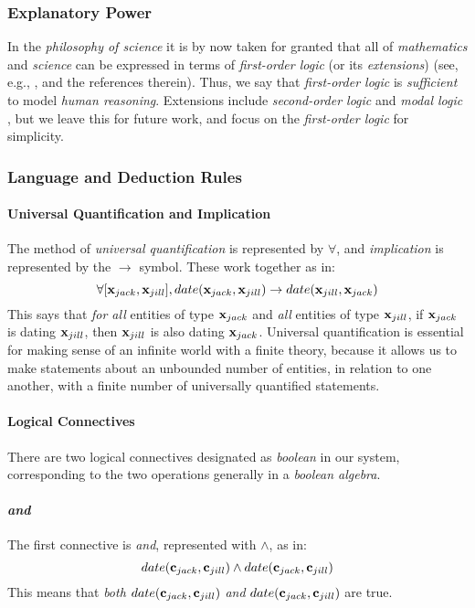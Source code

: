 \documentclass[11pt]{article}
\newcommand{\constant}[1]{{\bf c}_{#1}}
\newcommand{\variable}[1]{{\bf x}_{#1}}
\newcommand{\xvariable}{{\bf x}}
\newcommand{\opand}{\textbf{\em and}}
\begin{document}
\subsubsection*{Explanatory Power}
In the {\em philosophy of science} it is by now taken for granted that all of {\em mathematics} and {\em science} can be expressed in terms of {\em first-order logic} (or its {\em extensions}) (see, e.g., \cite{Pelletier2000}, and the references therein).
Thus, we say that {\em first-order logic} is {\em sufficient} to model {\em human reasoning}.
Extensions include {\em second-order logic} and {\em modal logic} \cite{Prawitz1965}, but we leave this for future work, and focus on the {\em first-order logic} for simplicity.

\subsubsection*{Language and Deduction Rules}
\paragraph{Universal Quantification and Implication}
The method of {\em universal quantification} is represented by $\forall$, and {\em implication} is represented by the $\rightarrow$ symbol.
These work together as in:
\begin{equation} \forall [\variable{jack}, \variable{jill}], date(\variable{jack}, \variable{jill}) \rightarrow date(\variable{jill}, \variable{jack}) \end{equation}
This says that {\em for all} entities of type $\xvariable_{jack}$ and {\em all} entities of type $\xvariable_{jill}$, if $\xvariable_{jack}$ is dating $\xvariable_{jill}$, then $\xvariable_{jill}$ is also dating $\xvariable_{jack}$.
Universal quantification is essential for making sense of an infinite world with a finite theory, because it allows us to make statements about an unbounded number of entities, in relation to one another, with a finite number of universally quantified statements.

\paragraph{Logical Connectives}
There are two logical connectives designated as {\em boolean} in our system, corresponding to the two operations generally in a {\em boolean algebra}.
\paragraph{\opand}
The first connective is {\em and}, represented with $\wedge$, as in:
\begin{equation} date(\constant{jack}, \constant{jill}) \wedge date(\constant{jack}, \constant{jill}) \end{equation}
This means that {\em both} $date(\constant{jack}, \constant{jill})$ {\em and} $date(\constant{jack}, \constant{jill})$ are true.
\end{document}
